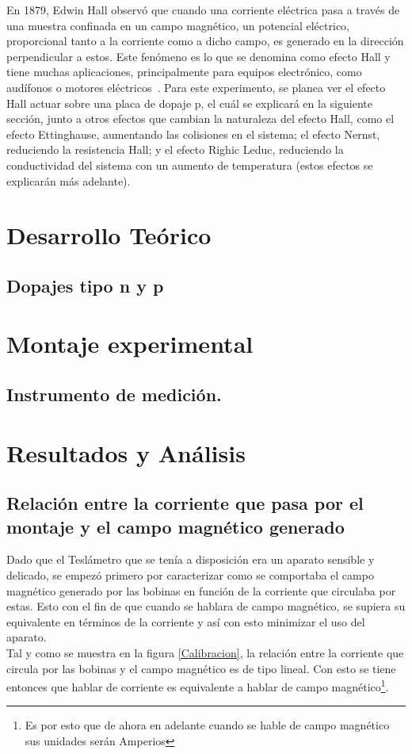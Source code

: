 \documentclass[%
 reprint,
 amsmath,amssymb,
 aps,
]{revtex4-1}
\begin{document}
 En 1879, Edwin Hall observó que cuando una corriente eléctrica pasa a través de una muestra confinada en un campo magnético, un potencial eléctrico, proporcional tanto a la corriente como a dicho campo, es generado en la dirección perpendicular a estos. Este fenómeno es lo que se denomina como efecto Hall y tiene muchas aplicaciones, principalmente para equipos electrónico, como audífonos o motores eléctricos~\cite{Efecto Hall}. Para este experimento, se planea ver el efecto Hall actuar sobre una placa de dopaje p, el cuál se explicará en la siguiente sección, junto a otros efectos que cambian la naturaleza del efecto Hall, como el efecto Ettinghause, aumentando las colisiones en el sistema; el efecto Nernst, reduciendo la resistencia Hall; y el efecto Righic Leduc, reduciendo la conductividad del sistema con un aumento de temperatura (estos efectos se explicarán más adelante).

 \section{Desarrollo Teórico}
 
 \subsection{Dopajes tipo n y p}
 
 
 
\section{Montaje experimental}
\subsection{Instrumento de medición.}


\section{Resultados y Análisis}
\subsection{Relación entre la corriente que pasa por el montaje y el campo magnético generado}
Dado que el Teslámetro que se tenía a disposición era un aparato sensible y delicado, se empezó primero por caracterizar como se comportaba el campo magnético generado por las bobinas en función de la corriente que circulaba por estas. Esto con el fin de que cuando se hablara de campo magnético, se supiera su equivalente en términos de la corriente y así con esto minimizar el uso del aparato.\\
Tal y como se muestra en la figura \ref{Calibracion}, la relación entre la corriente que circula por las bobinas y el campo magnético es de tipo lineal. Con esto se tiene entonces que hablar de corriente es equivalente a hablar de campo magnético\footnote{Es por esto que de ahora en adelante cuando se hable de campo magnético sus unidades serán Amperios}.
\end{document}
